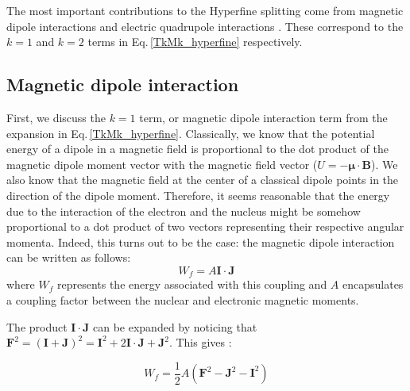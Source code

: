 The most important contributions to the Hyperfine splitting come from magnetic dipole interactions and electric quadrupole interactions \cite{sobelman_spectra}\cite{schwartz_hyperfine_expansion}\cite{cuaMITnotes}. These correspond to the $k=1$ and $k=2$ terms in Eq.\,\ref{TkMk_hyperfine} respectively\cite{experimental_hyperfine_alkali_arimondo}.
\subsection{Magnetic dipole interaction}

First, we discuss the $k=1$ term, or magnetic dipole interaction term from the expansion in Eq.\,\ref{TkMk_hyperfine}. Classically, we know that the potential energy of a dipole in a magnetic field is proportional to the dot product of the magnetic dipole moment vector with the magnetic field vector ($U=-\mathbf{\mu}\cdot\mathbf{B}$). We also know that the magnetic field at the center of a classical dipole points in the direction of the dipole moment. Therefore, it seems reasonable that the energy due to the interaction of the electron and the nucleus might be somehow proportional to a dot product of two vectors representing their respective angular momenta. Indeed, this turns out to be the case: the magnetic dipole interaction can be written as follows\cite{sobelman_spectra}: 
\begin{equation}\label{IdotJ}
W_f=A\mathbf{I}\cdot\mathbf{J}
\end{equation}
where $W_f$ represents the energy associated with this coupling and $A$ encapsulates a coupling factor between the nuclear and electronic magnetic moments. 

The product $\mathbf{I}\cdot\mathbf{J}$ can be expanded by noticing that $\mathbf{F}^2=(\mathbf{I}+\mathbf{J})^2=\mathbf{I}^2+2 \mathbf{I}\cdot\mathbf{J}+\mathbf{J}^2$. This gives \cite{cuaMITnotes}\cite{sobelman_spectra}: 

\begin{equation}\label{Wf_dot_product}
W_f=\frac{1}{2}A(\mathbf{F}^2-\mathbf{J}^2-\mathbf{I}^2)
\end{equation}

